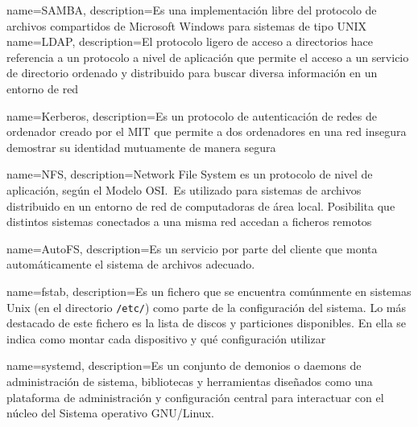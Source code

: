 {
  name=SAMBA,
  description={Es una implementación libre del protocolo de archivos
    compartidos de Microsoft Windows para sistemas de tipo UNIX}
}
{
  name=LDAP,
  description={El protocolo ligero de acceso a directorios hace referencia a un
    protocolo a nivel de aplicación que permite el acceso a un servicio de
    directorio ordenado y distribuido para buscar diversa información en un
    entorno de red}
}

{
  name=Kerberos,
  description={Es un protocolo de autenticación de redes de ordenador creado
    por el MIT que permite a dos ordenadores en una red insegura demostrar
    su identidad mutuamente de manera segura}
}

{
  name=NFS,
  description={Network File System es un
    protocolo de nivel de aplicación, según el Modelo OSI.~Es utilizado para
    sistemas de archivos distribuido en un entorno de red de computadoras de
    área local. Posibilita que distintos sistemas conectados a una misma red
    accedan a ficheros remotos}
}

{
  name=AutoFS,
  description={Es un servicio por parte del cliente que monta
    automáticamente el sistema de archivos adecuado.}
}

{
  name=fstab,
  description={Es un fichero que se encuentra comúnmente en
    sistemas Unix (en el directorio \texttt{/etc/}) como parte de la
    configuración del sistema. Lo más destacado de este fichero es la lista de
    discos y particiones disponibles. En ella se indica como montar cada
    dispositivo y qué configuración utilizar}
}

{
  name=systemd,
  description={Es un conjunto de demonios o daemons de
    administración de sistema, bibliotecas y herramientas diseñados como una
    plataforma de administración y configuración central para interactuar con
    el núcleo del Sistema operativo GNU/Linux.}
}






